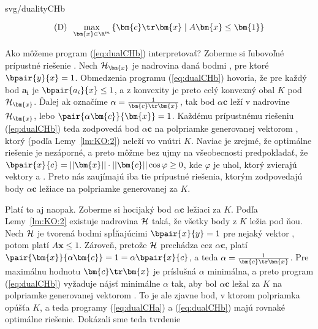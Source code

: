 \noindent
\begin{minipage}[t]{4cm}
  \vspace{0pt}
  \begin{myfig}{\textwidth}{svg/dualityCHb}
  \end{myfig}
\end{minipage}\hspace*{1cm}\begin{minipage}[t]{\textwidth-5cm}
  \vspace{0pt}

\begin{equation}
  \label{eq:dualCHb}
  \text{(D)}\;\;  \max_{\bm{x}\in\R^m}\left\{ \bm{c}\tr\bm{x} \mid A\bm{x}\le\bm{1}\right\}
\end{equation}

\noindent
Ako môžeme program (\ref{eq:dualCHb}) interpretovať? Zoberme si ľubovoľné prípustné riešenie . 
Nech ${\cal H}_{\bm{x}}$ je nadrovina daná bodmi , pre ktoré $\bpair{y}{x}=1$.
Obmedzenia programu (\ref{eq:dualCHb}) hovoria, že pre každý bod $\bm{a_i}$ je 
$\bpair{a_i}{x}\le1$, a z konvexity je preto celý konvexný obal $K$ pod ${\cal H}_{\bm{x}}$.
Ďalej ak označíme $\alpha=\frac{1}{\bm{c}\tr\bm{x}}$, tak  bod $\alpha\bm{c}$ leží v nadrovine 
${\cal H}_{\bm{x}}$, lebo $\pair{\alpha\bm{c}}{\bm{x}}=1$. Každému prípustnému riešeniu (\ref{eq:dualCHb})
teda zodpovedá bod $\alpha\bm{c}$ na polpriamke generovanej vektorom , ktorý (podľa Lemy~\ref{lm:KO:2})
neleží vo vnútri $K$.
Naviac je zrejmé, že optimálne riešenie je nezáporné, a preto môžme bez ujmy na všeobecnosti predpokladať,
že $\bpair{x}{c}=||\bm{x}||\cdot||\bm{c}||\cos\varphi\ge0$, kde $\varphi$ je uhol, ktorý zvierajú
vektory  a . Preto nás zaujímajú iba tie prípustné riešenia, ktorým zodpovedajú
body $\alpha\bm{c}$ ležiace na polpriamke generovanej  za $K$.
\end{minipage}

\vspace*{-4ex}
\noindent
Platí to aj naopak. Zoberme si hocijaký bod $\alpha\bm{c}$ ležiaci za $K$. Podľa Lemy~\ref{lm:KO:2}
existuje nadrovina $\cal H$ taká, že všetky body z $K$ ležia pod ňou. Nech $\cal H$ je tvorená
bodmi  spĺňajúcimi $\bpair{x}{y}=1$ pre nejaký vektor , potom platí $A\bm{x}\le1$.
Zároveň, pretože $\cal H$ prechádza cez $\alpha\bm{c}$, platí 
$\pair{\bm{x}}{\alpha\bm{c}}=1=\alpha\bpair{x}{c}$, a teda $\alpha=\frac{1}{\bm{c}\tr\bm{x}}$.
Pre maximálnu hodnotu $\bm{c}\tr\bm{x}$ je príslušná $\alpha$ minimálna, a preto program (\ref{eq:dualCHb})
vyžaduje nájsť minimálne $\alpha$ tak, aby bol $\alpha\bm{c}$ ležal za $K$ na polpriamke generovanej 
vektorom . To je ale zjavne bod, v ktorom polpriamka opúšťa $K$, a teda programy
(\ref{eq:dualCHa}) a (\ref{eq:dualCHb}) majú rovnaké optimálne riešenie.
Dokázali sme teda tvrdenie

